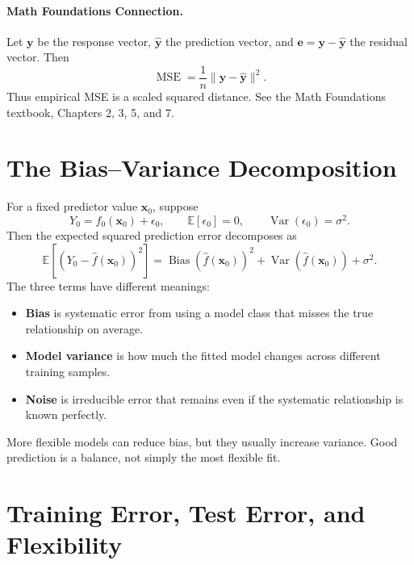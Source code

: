 {\paragraph{Math Foundations Connection.}
Let $\mathbf{y}$ be the response vector, $\widehat{\mathbf{y}}$ the prediction vector, and $\mathbf{e}=\mathbf{y}-\widehat{\mathbf{y}}$ the residual vector.  Then
\begin{equation}
  \operatorname{MSE}=\frac{1}{n}\|\mathbf{y}-\widehat{\mathbf{y}}\|^2.
  \label{eq:ch2-mse-norm}
\end{equation}
Thus empirical MSE is a scaled squared distance.  See the Math Foundations textbook, Chapters 2, 3, 5, and 7.

\section{The Bias--Variance Decomposition}

For a fixed predictor value $\mathbf{x}_0$, suppose
\begin{equation}
  Y_0=f_0(\mathbf{x}_0)+\epsilon_0,
  \qquad
  \mathbb{E}[\epsilon_0]=0,
  \qquad
  \operatorname{Var}(\epsilon_0)=\sigma^2.
  \label{eq:ch2-new-response}
\end{equation}
Then the expected squared prediction error decomposes as
\begin{equation}
  \boxed{
  \mathbb{E}\left[\left(Y_0-\hat f(\mathbf{x}_0)\right)^2\right]
  =\operatorname{Bias}(\hat f(\mathbf{x}_0))^2
  +\operatorname{Var}(\hat f(\mathbf{x}_0))
  +\sigma^2.}
  \label{eq:ch2-bias-variance-final}
\end{equation}
The three terms have different meanings:
\begin{itemize}
  \item \textbf{Bias} is systematic error from using a model class that misses the true relationship on average.
  \item \textbf{Model variance} is how much the fitted model changes across different training samples.
  \item \textbf{Noise} is irreducible error that remains even if the systematic relationship is known perfectly.
\end{itemize}
More flexible models can reduce bias, but they usually increase variance.  Good prediction is a balance, not simply the most flexible fit.

\section{Training Error, Test Error, and Flexibility}

}
